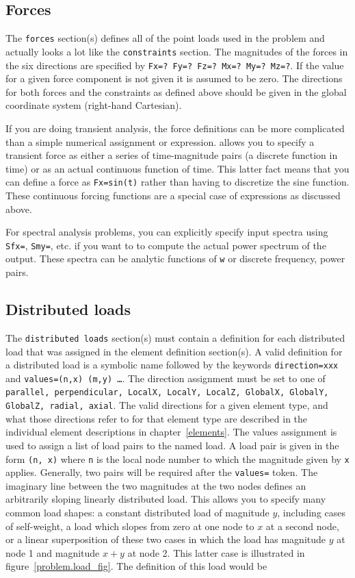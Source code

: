 \subsection{Forces}

The {\tt forces} section(s) defines all of the point loads used in the problem 
and actually looks a lot like the {\tt constraints} section.  The magnitudes of 
the forces in the six directions are specified by {\tt Fx=? Fy=? Fz=? Mx=? 
My=? Mz=?}.  If the value for a given force component is not given it is 
assumed to be zero.  The directions for both forces and the constraints as 
defined above should be given in the global coordinate system (right-hand 
Cartesian). 

If you are doing transient analysis, the force definitions can be more
complicated than a simple numerical assignment or expression.  \felt{}
allows you to specify a transient force as either a series of time-magnitude 
pairs (a discrete function in time) or as an actual continuous function of 
time.  This latter fact means that you can define a force as {\tt Fx=sin(t)}
rather than having to discretize the sine function.  These continuous
forcing functions are a special case of expressions as discussed above.

For spectral analysis problems, you can explicitly specify input
spectra using {\tt Sfx=}, {\tt Smy=}, etc. if you want to to compute the
actual power spectrum of the output.  These spectra can be analytic
functions of {\tt w} or discrete frequency, power pairs.

\subsection{Distributed loads}

The {\tt distributed loads} section(s) must contain a definition for
each distributed load that was assigned in the element definition
section(s).  A valid definition for a distributed load is a symbolic
name followed by the keywords {\tt direction=xxx} and 
{\tt values=(n,x) (m,y) \dots}.  The direction assignment must be set to one of 
{\tt parallel, perpendicular, LocalX, LocalY, LocalZ, GlobalX, GlobalY, 
GlobalZ, radial, axial}. 
The valid directions for a given element type, and what those
directions refer to for that element type are described in the individual
element descriptions in chapter~\ref{elements}.  The values assignment is used 
to assign a list of load pairs to the named load.  A load pair is given in the 
form {\tt (n, x)} where {\tt n} is the local node number to which the magnitude 
given by {\tt x} applies.  Generally, two pairs will be required after the
{\tt values=} token.  The imaginary line between the two magnitudes at
the two nodes defines an arbitrarily sloping linearly distributed load.
This allows you to specify many common load shapes: a constant
distributed load of magnitude $y$, including cases of self-weight, a
load which slopes from zero at one node to $x$ at a second node, or a
linear superposition of these two cases in which the load has magnitude
$y$ at node 1 and magnitude $x+y$ at node 2.  This latter case is
illustrated in figure~\ref{problem.load_fig}.  The definition of this
load would be 

